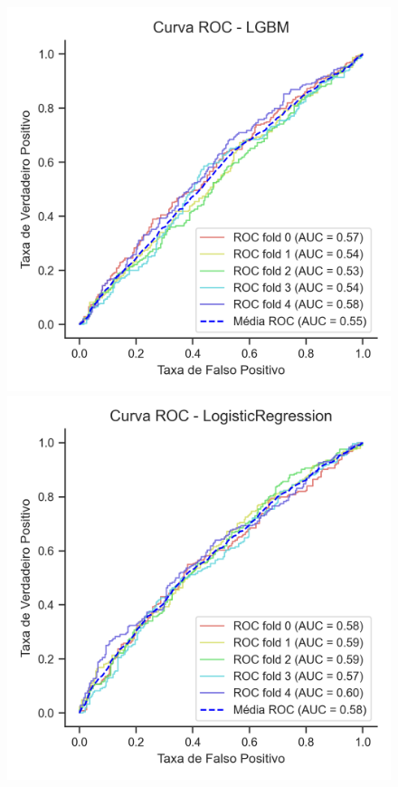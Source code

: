 \begin{figure}[htb]
\begin{minipage}[t]{0.28\textwidth}
	\end{minipage}
	\hfill
	\begin{minipage}[t]{0.28\textwidth}
		\centering
		\includegraphics[width=\textwidth]{USPSC-img/Curva ROC - LGBM.png}
	\end{minipage}
	\hfill
	\begin{minipage}[t]{0.28\textwidth}
		\centering
		\includegraphics[width=\textwidth]{USPSC-img/Curva ROC - LogisticRegression.png}
	\end{minipage}
	

\end{figure}
